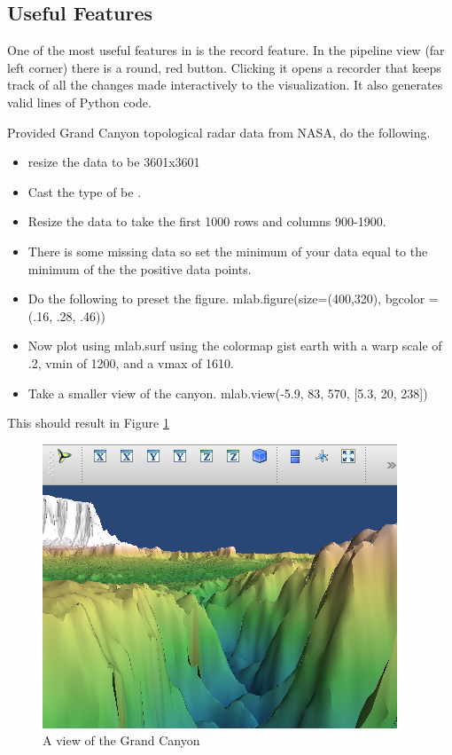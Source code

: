 \subsection*{Useful Features} 
One of the most useful features in  is the record feature. 
In the pipeline view (far left corner) there is a round, red button. 
Clicking it opens a recorder that keeps track of all the changes made 
interactively to the visualization. It also generates valid lines of Python code. 

\begin{problem} 
Provided Grand Canyon topological radar data from NASA, 
do the following.

\begin{itemize}
\item resize the data to be 3601x3601
\item Cast the type of be . 
\item Resize the data to take the first 1000 rows and columns 900-1900.
\item There is some missing data so set the minimum of your data equal to the minimum of the the positive data points. 
\item Do the following to preset the figure. mlab.figure(size=(400,320), bgcolor = (.16, .28, .46))
\item Now plot using mlab.surf using the colormap gist earth with a warp scale of .2, vmin of 1200, and a vmax of 1610.
\item Take a smaller view of the canyon. mlab.view(-5.9, 83, 570, [5.3, 20, 238])
\end{itemize}

This should result in Figure \ref{mayavi:GrandCanyon}
\end{problem}

\begin{figure} 
\includegraphics[width=\textwidth]{GrandCanyon.pdf}
\caption{A view of the Grand Canyon} 
\label{mayavi:GrandCanyon}
\end{figure}

